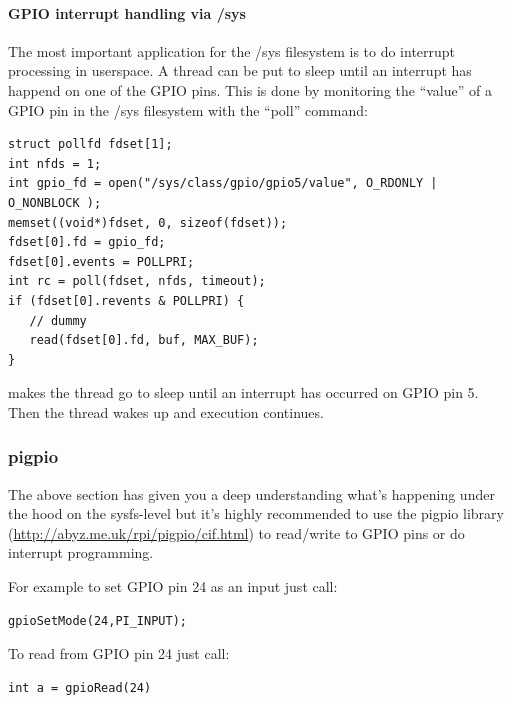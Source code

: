 \documentclass[12pt]{report}
\begin{document}
\paragraph{GPIO interrupt handling via /sys}
The most important application for the /sys filesystem is to
do interrupt processing in userspace.
A thread can be put to sleep until an interrupt has happend on one of
the GPIO pins. This is done by monitoring the ``value''
of a GPIO pin in the /sys filesystem with the ``poll'' command:
\begin{verbatim}
struct pollfd fdset[1];
int nfds = 1;
int gpio_fd = open("/sys/class/gpio/gpio5/value", O_RDONLY | O_NONBLOCK );
memset((void*)fdset, 0, sizeof(fdset));
fdset[0].fd = gpio_fd;
fdset[0].events = POLLPRI;
int rc = poll(fdset, nfds, timeout);
if (fdset[0].revents & POLLPRI) {
   // dummy
   read(fdset[0].fd, buf, MAX_BUF);
}
\end{verbatim}
makes the thread go to sleep until an interrupt has occurred on
GPIO pin 5. Then the thread wakes up and execution continues.

\subsubsection{pigpio}
The above section has given you a deep understanding what's happening
under the hood on the sysfs-level but it's highly recommended to
use the pigpio library (\url{http://abyz.me.uk/rpi/pigpio/cif.html})
to read/write to GPIO pins or do interrupt programming.

For example to set GPIO pin 24 as an input just call:
\begin{verbatim}
gpioSetMode(24,PI_INPUT);
\end{verbatim}

To read from GPIO pin 24 just call:
\begin{verbatim}
int a = gpioRead(24)
\end{verbatim}
\end{document}
